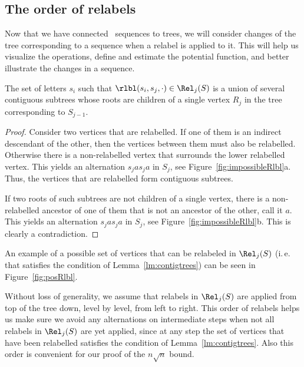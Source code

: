 \subsection{The order of relabels}

Now that we have connected \Ds~sequences to trees, we will consider changes of the tree corresponding to a sequence when a relabel is applied to it. This will help us visualize the operations, define and estimate the potential function, and better illustrate the changes in a sequence.



\begin{lemma} \label{lm:contigtrees}
	The set of letters $s_i$ such that $\rlbl (s_i, s_j, \cdot) \in \Rel_j (S)$ is a union of several contiguous subtrees whose roots are children of a single vertex $R_j$ in the tree corresponding to $S_{j-1}$.
\end{lemma}

\begin{proof} Consider two vertices that are relabelled. If one of them is an indirect descendant of the other, then the vertices between them must also be relabelled. Otherwise there is a non-relabelled vertex that surrounds the lower relabelled vertex. This yields an alternation $s_j a s_j a$ in $S_{j}$, see Figure~\ref{fig:impossibleRlbl}a. Thus, the vertices that are relabelled form contiguous subtrees.

	If two roots of such subtrees are not children of a single vertex, there is a non-relabelled ancestor of one of them that is not an ancestor of the other, call it $a$. This yields an alternation $s_j a s_j a$ in $S_{j}$, see Figure~\ref{fig:impossibleRlbl}b. This is clearly a contradiction. \end{proof}



An example of a possible set of vertices that can be relabeled in $\Rel_j (S)$ (i.\,e. that satisfies the condition of Lemma~\ref{lm:contigtrees}) can be seen in Figure~\ref{fig:posRlbl}.

Without loss of generality, we assume that relabels in $\Rel_j (S)$ are applied from top of the tree down, level by level, from left to right. This order of relabels helps us make sure we avoid any alternations on intermediate steps when not all relabels in $\Rel_j (S)$ are yet applied, since at any step the set of vertices that have been relabelled satisfies the condition of Lemma~\ref{lm:contigtrees}. Also this order is convenient for our proof of the $n\sqrt{n}$ bound.

